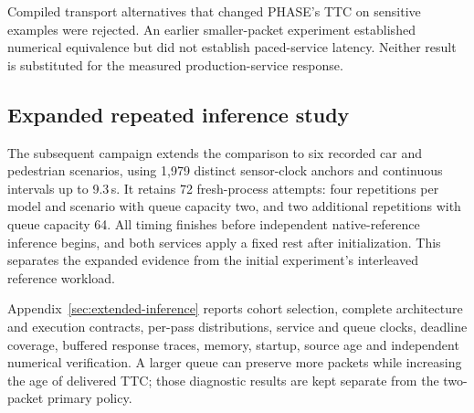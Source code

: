 Compiled transport alternatives that changed PHASE's TTC on sensitive examples were rejected. An earlier smaller-packet experiment established numerical equivalence but did not establish paced-service latency. Neither result is substituted for the measured production-service response. 

\subsection{Expanded repeated inference study}

The subsequent campaign extends the comparison to six recorded car and pedestrian scenarios, using 1,979 distinct sensor-clock anchors and continuous intervals up to 9.3\,s. It retains 72 fresh-process attempts: four repetitions per model and scenario with queue capacity two, and two additional repetitions with queue capacity 64. All timing finishes before independent native-reference inference begins, and both services apply a fixed rest after initialization. This separates the expanded evidence from the initial experiment's interleaved reference workload.

\begin{table}[H]
\centering\small
\caption{\textbf{Expanded persistent-service comparison at 50\,Hz.} S1--S6 denote CPLA-low, CCRm-medium-0, CCRs-3-low-100, CCRs-side-high, CPNA-high and CPNAO-high. Q2 and Q64 denote queue capacities two and 64. D/A/N gives complete deliveries, numerically admitted runs and declared attempts. Median per-pass p95 (ms) requires full delivery and native parity in all four Q2 repetitions or both Q64 repetitions; all attempts remain in the full tables.}

\end{table}


Appendix~\ref{sec:extended-inference} reports cohort selection, complete architecture and execution contracts, per-pass distributions, service and queue clocks, deadline coverage, buffered response traces, memory, startup, source age and independent numerical verification. A larger queue can preserve more packets while increasing the age of delivered TTC; those diagnostic results are kept separate from the two-packet primary policy.

